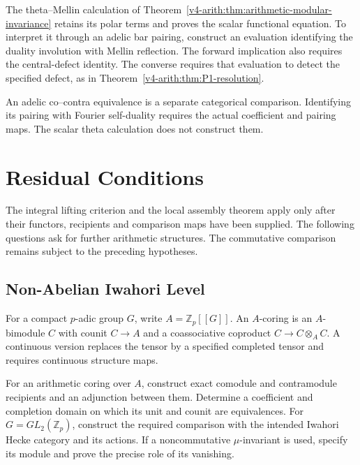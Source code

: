 \begin{remark}
\label{v4-arith:pos:rem:adelic-fe}
The theta--Mellin calculation of
Theorem~\ref{v4-arith:thm:arithmetic-modular-invariance} retains
its polar terms and proves the scalar functional equation.
To interpret it through an adelic bar pairing, construct an
evaluation identifying the duality involution with Mellin reflection.
The forward implication also requires the central-defect identity.
The converse requires that evaluation to detect the specified defect,
as in Theorem~\ref{v4-arith:thm:P1-resolution}.

An adelic co--contra equivalence is a separate categorical
comparison. Identifying its pairing with Fourier self-duality
requires the actual coefficient and pairing maps.
The scalar theta calculation does not construct them.
\end{remark}

\section{Residual Conditions}
\label{v4-arith:pos:residual-domain}

The integral lifting criterion and the local assembly theorem
apply only after their functors, recipients and comparison
maps have been supplied. The following questions ask for further arithmetic structures.
The commutative comparison remains subject to the preceding
hypotheses.

\subsection{Non-Abelian Iwahori Level}
\label{v4-arith:pos:non-abelian}

For a compact \(p\)-adic group \(G\), write
\(A=\mathbb Z_p[[G]]\). An \(A\)-coring is an
\(A\)-bimodule \(C\) with counit \(C\to A\) and a
coassociative coproduct \(C\to C\otimes_A C\).
A continuous version replaces the tensor by a specified
completed tensor and requires continuous structure maps.

\begin{question}
\label{v4-arith:pos:cj:non-commutative}
For an arithmetic coring over \(A\), construct exact comodule
and contramodule recipients and an adjunction between them.
Determine a coefficient and completion domain on which its
unit and counit are equivalences.
For \(G=GL_2(\mathbb Z_p)\), construct the required comparison
with the intended Iwahori Hecke category and its actions.
If a noncommutative \(\mu\)-invariant is used, specify its
module and prove the precise role of its vanishing.
\end{question}

